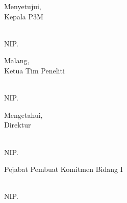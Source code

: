 \vspace{0.4cm}

\noindent
\begin{minipage}[t]{0.48\textwidth}
    \begin{center}
        Menyetujui,\\
        Kepala P3M

        \vspace{1.5cm}

        \textbf{\ketuaPPMNama}\\
        NIP. \ketuaPPMNIDN
    \end{center}
\end{minipage}
\hfill
\begin{minipage}[t]{0.48\textwidth}
    \begin{center}
        Malang, \tanggalPengesahan\\
        Ketua Tim Peneliti

        \vspace{1.5cm}

        \textbf{\ketuaNama}\\
        NIP. \ketuaNIP
    \end{center}
\end{minipage}

\vspace{0.4cm}

\noindent
\begin{minipage}[t]{0.48\textwidth}
    \begin{center}
        Mengetahui,\\
        Direktur

        \vspace{1.5cm}

        \textbf{\direkturNama}\\
        NIP. \direkturNIDN
    \end{center}
\end{minipage}
\hfill
\begin{minipage}[t]{0.48\textwidth}
    \begin{center}
        Pejabat Pembuat Komitmen Bidang I

        \vspace{2cm}

        \textbf{\ppkNama}\\
        NIP. \ppkNIDN
    \end{center}
\end{minipage}
